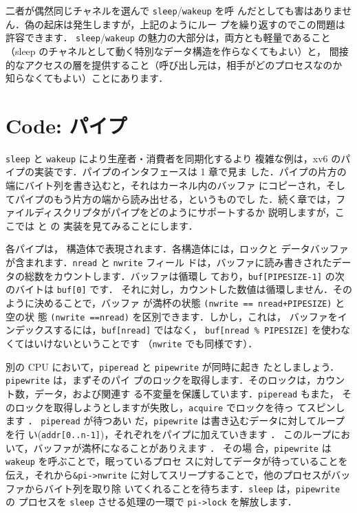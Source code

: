 二者が偶然同じチャネルを選んで  \texttt{sleep}/\texttt{wakeup} を呼
んだとしても害はありません．偽の起床は発生しますが，上記のようにルー
プを繰り返すのでこの問題は許容できます．
\texttt{sleep}/\texttt{wakeup} の魅力の大部分は，両方とも軽量であること
（sleep のチャネルとして動く特別なデータ構造を作らなくてもよい）と，
間接的なアクセスの層を提供すること（呼び出し元は，相手がどのプロセスなのか
知らなくてもよい）ことにあります．

\section{Code: パイプ}
\lstinline{sleep} と \lstinline{wakeup} により生産者・消費者を同期化するより
複雑な例は，xv6 のパイプの実装です．パイプのインタフェースは 1 章で見ま
した．パイプの片方の端にバイト列を書き込むと，それはカーネル内のバッファ
にコピーされ，そしてパイプのもう片方の端から読み出せる，というものでし
た．続く章では，ファイルディスクリプタがパイプをどのようにサポートするか
説明しますが，ここでは  と  の
実装を見てみることにします．

各パイプは， 構造体で表現されます．各構造体には，ロックと
データバッファが含まれます．\lstinline{nread} と \lstinline{nwrite} フィール
ドは，バッファに読み書きされたデータの総数をカウントします．バッファは循環し
ており，\lstinline{buf[PIPESIZE-1]} の次のバイトは \lstinline{buf[0]} です．
それに対し，カウントした数値は循環しません．そのように決めることで，バッファ
が満杯の状態 \lstinline{(nwrite == nread+PIPESIZE)} と空の状
態 \lstinline{(nwrite ==nread)} を区別できます．しかし，これは，
バッファをインデックスするには，\lstinline{buf[nread]} ではなく，
\lstinline{buf[nread % PIPESIZE]} を使わなくてはいけないということです
（\lstinline{nwrite} でも同様です）．

別の CPU において，\lstinline{piperead} と \lstinline{pipewrite} が同時に起き
たとしましょう．\lstinline{pipewrite} 
は，まずそのパイ
プのロックを取得します．そのロックは，カウント数，データ，および関連す
る不変量を保護しています．\lstinline{piperead}
 もまた，
そのロックを取得しようとしますが失敗し，\lstinline{acquire} でロックを待っ
てスピンします
．
\lstinline{piperead} が待つあい
だ，\lstinline{pipewrite} は書き込むデータに対してループを行
い(\lstinline{addr[0..n-1]})，それぞれをパイプに加えていきます
．
このループにおいて，バッファが満杯になることがありえます
．
その場
合，\lstinline{pipewrite} は\lstinline{wakeup} を呼ぶことで，眠っているプロセ
スに対してデータが待っていることを伝え，それから\lstinline{&pi->nwrite}
に対してスリープすることで，他のプロセスがバッファからバイト列を取り除
いてくれることを待ちます．\lstinline{sleep} は，\lstinline{pipewrite} の
プロセスを \lstinline{sleep} させる処理の一環で \lstinline{pi->lock} を解放します．

